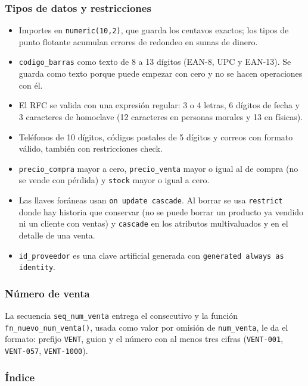 \documentclass[12pt,a4paper]{article}
\newcommand{\cod}[1]{{\ttfamily\nolinkurl{#1}}}
\begin{document}
\subsubsection{Tipos de datos y restricciones}

\begin{itemize}[leftmargin=1.2cm, itemsep=0.2em]
\item Importes en \cod{numeric(10,2)}, que guarda los centavos exactos; los tipos de
punto flotante acumulan errores de redondeo en sumas de dinero.
\item \cod{codigo_barras} como texto de 8 a 13 dígitos (EAN-8, UPC y EAN-13). Se
guarda como texto porque puede empezar con cero y no se hacen operaciones con él.
\item El RFC se valida con una expresión regular: 3 o 4 letras, 6 dígitos de fecha y
3 caracteres de homoclave (12 caracteres en personas morales y 13 en físicas).
\item Teléfonos de 10 dígitos, códigos postales de 5 dígitos y correos con formato
válido, también con restricciones check.
\item \cod{precio_compra} mayor a cero, \cod{precio_venta} mayor o igual al de
compra (no se vende con pérdida) y \cod{stock} mayor o igual a cero.
\item Las llaves foráneas usan \cod{on update cascade}. Al borrar se usa
\cod{restrict} donde hay historia que conservar (no se puede borrar un producto ya
vendido ni un cliente con ventas) y \cod{cascade} en los atributos multivaluados y
en el detalle de una venta.
\item \cod{id_proveedor} es una clave artificial generada con
\cod{generated always as identity}.
\end{itemize}

\subsubsection{Número de venta}

La secuencia \cod{seq_num_venta} entrega el consecutivo y la función
\cod{fn_nuevo_num_venta()}, usada como valor por omisión de \cod{num_venta}, le da
el formato: prefijo \cod{VENT}, guion y el número con al menos tres cifras
(\cod{VENT-001}, \cod{VENT-057}, \cod{VENT-1000}).

\subsubsection{Índice}
\end{document}
